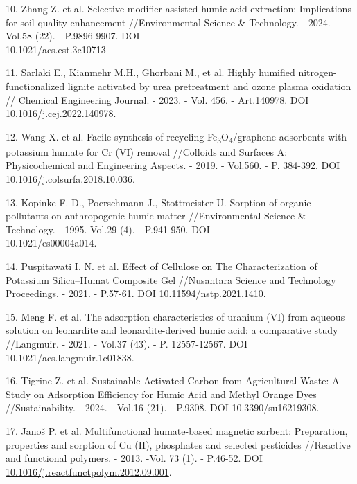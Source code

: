 \begin{references}
10. Zhang Z. et al. Selective modifier-assisted humic acid extraction:
Implications for soil quality enhan\-cement //Environmental Science \&
Technology. - 2024.- Vol.58 (22). - P.9896-9907. DOI\\
10.1021/acs.est.3c10713

11. Sarlaki E., Kianmehr M.H., Ghorbani M., et al. Highly humified
nitrogen-functionalized lignite activ\-ated by urea pretreatment and
ozone plasma oxidation // Chemical Engineering Journal. - 2023. - Vol.
456. - Art.140978. DOI
\href{https://doi.org/10.1016/j.cej.2022.140978}{10.1016/j.cej.2022.140978}.

12. Wang X. et al. Facile synthesis of recycling
Fe\textsubscript{3}O\textsubscript{4}/graphene adsorbents with
potassium humate for Cr (VI) removal //Colloids and Surfaces A:
Physicochemical and Engineering Aspects. - 2019. - Vol.560. - P.
384-392. DOI 10.1016/j.colsurfa.2018.10.036.

13. Kopinke F. D., Poerschmann J., Stottmeister U. Sorption of organic
pollutants on anthropogenic humic matter //Environmental Science \&
Technology. - 1995.-Vol.29 (4). - P.941-950. DOI\\
10.1021/es00004a014.

14. Puspitawati I. N. et al. Effect of Cellulose on The Characterization
of Potassium Silica--Humat Compo\-site Gel //Nusantara Science and
Technology Proceedings. - 2021. - P.57-61. DOI
10.11594/nstp.2021.1410.

15. Meng F. et al. The adsorption characteristics of uranium (VI) from
aqueous solution on leonardite and leonardite-derived humic acid: a
comparative study //Langmuir. - 2021. - Vol.37 (43). - P.
12557-12567. DOI 10.1021/acs.langmuir.1c01838.

16. Tigrine Z. et al. Sustainable Activated Carbon from Agricultural
Waste: A Study on Adsorption Effic\-iency for Humic Acid and Methyl
Orange Dyes //Sustainability. - 2024. - Vol.16 (21). - P.9308. DOI
10.3390/su16219308.

17. Janoš P. et al. Multifunctional humate-based magnetic sorbent:
Preparation, properties and sorption of Cu (II), phosphates and
selected pesticides //Reactive and functional polymers. - 2013. -Vol.
73 (1). - P.46-52. DOI
\href{https://doi.org/10.1016/j.reactfunctpolym.2012.09.001}{10.1016/j.reactfunctpolym.2012.09.001}.
\end{references}

